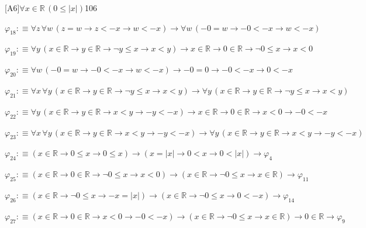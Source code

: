 \begin{fullproof}{[A6]}{$\forall x \in \mathbb{R}\,(0 \leq \lvert x \rvert)$}{106}
\begin{abbrevlist}
\item $\varphi_{18} :\equiv \forall z\,\forall w\,(z = w \to z < -x \to w < -x) \to \forall w\,(-0 = w \to -0 < -x \to w < -x)$
\item $\varphi_{19} :\equiv \forall y\,(x \in \mathbb{R} \to y \in \mathbb{R} \to \neg y \leq x \to x < y) \to x \in \mathbb{R} \to 0 \in \mathbb{R} \to \neg 0 \leq x \to x < 0$
\item $\varphi_{20} :\equiv \forall w\,(-0 = w \to -0 < -x \to w < -x) \to -0 = 0 \to -0 < -x \to 0 < -x$
\item $\varphi_{21} :\equiv \forall x\,\forall y\,(x \in \mathbb{R} \to y \in \mathbb{R} \to \neg y \leq x \to x < y) \to \forall y\,(x \in \mathbb{R} \to y \in \mathbb{R} \to \neg y \leq x \to x < y)$
\item $\varphi_{22} :\equiv \forall y\,(x \in \mathbb{R} \to y \in \mathbb{R} \to x < y \to -y < -x) \to x \in \mathbb{R} \to 0 \in \mathbb{R} \to x < 0 \to -0 < -x$
\item $\varphi_{23} :\equiv \forall x\,\forall y\,(x \in \mathbb{R} \to y \in \mathbb{R} \to x < y \to -y < -x) \to \forall y\,(x \in \mathbb{R} \to y \in \mathbb{R} \to x < y \to -y < -x)$
\item $\varphi_{24} :\equiv (x \in \mathbb{R} \to 0 \leq x \to 0 \leq x) \to (x = \lvert x \rvert \to 0 < x \to 0 < \lvert x \rvert) \to \varphi_{4}$
\item $\varphi_{25} :\equiv (x \in \mathbb{R} \to 0 \in \mathbb{R} \to \neg 0 \leq x \to x < 0) \to (x \in \mathbb{R} \to \neg 0 \leq x \to x \in \mathbb{R}) \to \varphi_{11}$
\item $\varphi_{26} :\equiv (x \in \mathbb{R} \to \neg 0 \leq x \to -x = \lvert x \rvert) \to (x \in \mathbb{R} \to \neg 0 \leq x \to 0 < -x) \to \varphi_{14}$
\item $\varphi_{27} :\equiv (x \in \mathbb{R} \to 0 \in \mathbb{R} \to x < 0 \to -0 < -x) \to (x \in \mathbb{R} \to \neg 0 \leq x \to x \in \mathbb{R}) \to 0 \in \mathbb{R} \to \varphi_{9}$
\end{abbrevlist}
\end{fullproof}

